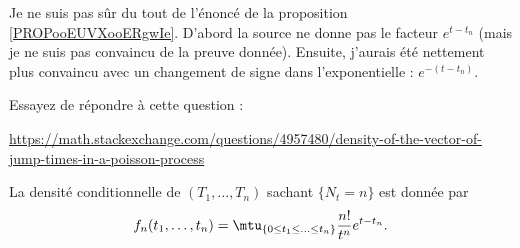 \begin{probleme}		\label{PROBooNZCUooMteOpL}
	Je ne suis pas sûr du tout de l'énoncé de la proposition \ref{PROPooEUVXooERgwIe}. D'abord la source \cite{BIBooORZFooWKgLCH} ne donne pas le facteur \( e^{t-t_n}\) (mais je ne suis pas convaincu de la preuve donnée). Ensuite, j'aurais été nettement plus convaincu avec un changement de signe dans l'exponentielle : \( e^{-(t-t_n)}\).

	Essayez de répondre à cette question :

	{
	\tiny
	\url{https://math.stackexchange.com/questions/4957480/density-of-the-vector-of-jump-times-in-a-poisson-process}
	}
\end{probleme}

\begin{proposition}	\label{PROPooEUVXooERgwIe}
	La densité conditionnelle de \( (T_1,\ldots,T_n)\) sachant \( \{ N_t=n \}\) est donnée par
	\begin{equation}
		f_n(t_1,\ldots,t_n)=\mtu_{\{ 0\leq t_1\leq\ldots\leq t_n \}}\frac{ n! }{ t^n }e^{t-t_n}.
	\end{equation}
\end{proposition}

